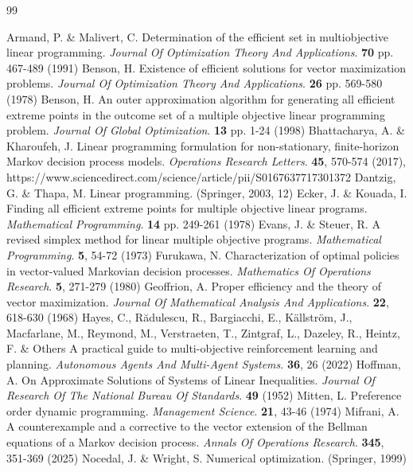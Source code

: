 \documentclass{article}
\theoremstyle{definition}
\numberwithin{equation}{section}
\begin{document}
\begin{thebibliography}{99}%

Armand, P. \& Malivert, C. Determination of the efficient set in multiobjective linear programming. {\em Journal Of Optimization Theory And Applications}. \textbf{70} pp. 467-489 (1991)
Benson, H. Existence of efficient solutions for vector maximization problems. {\em Journal Of Optimization Theory And Applications}. \textbf{26} pp. 569-580 (1978)
Benson, H. An outer approximation algorithm for generating all efficient extreme points in the outcome set of a multiple objective linear programming problem. {\em Journal Of Global Optimization}. \textbf{13} pp. 1-24 (1998)
Bhattacharya, A. \& Kharoufeh, J. Linear programming formulation for non-stationary, finite-horizon Markov decision process models. {\em Operations Research Letters}. \textbf{45}, 570-574 (2017), https://www.sciencedirect.com/science/article/pii/S0167637717301372
Dantzig, G. \& Thapa, M. Linear programming. (Springer, 2003, 12)
Ecker, J. \& Kouada, I. Finding all efficient extreme points for multiple objective linear programs. {\em Mathematical Programming}. \textbf{14} pp. 249-261 (1978)
Evans, J. \& Steuer, R. A revised simplex method for linear multiple objective programs. {\em Mathematical Programming}. \textbf{5}, 54-72 (1973)
Furukawa, N. Characterization of optimal policies in vector-valued Markovian decision processes. {\em Mathematics Of Operations Research}. \textbf{5}, 271-279 (1980)
Geoffrion, A. Proper efficiency and the theory of vector maximization. {\em Journal Of Mathematical Analysis And Applications}. \textbf{22}, 618-630 (1968)
Hayes, C., Rădulescu, R., Bargiacchi, E., Källström, J., Macfarlane, M., Reymond, M., Verstraeten, T., Zintgraf, L., Dazeley, R., Heintz, F. \& Others A practical guide to multi-objective reinforcement learning and planning. {\em Autonomous Agents And Multi-Agent Systems}. \textbf{36}, 26 (2022)
Hoffman, A. On Approximate Solutions of Systems of Linear Inequalities. {\em Journal Of Research Of The National Bureau Of Standards}. \textbf{49} (1952)
Mitten, L. Preference order dynamic programming. {\em Management Science}. \textbf{21}, 43-46 (1974)
Mifrani, A. A counterexample and a corrective to the vector extension of the Bellman equations of a Markov decision process. {\em Annals Of Operations Research}. \textbf{345}, 351-369 (2025)
Nocedal, J. \& Wright, S. Numerical optimization. (Springer, 1999)

\end{thebibliography}
\end{document}
